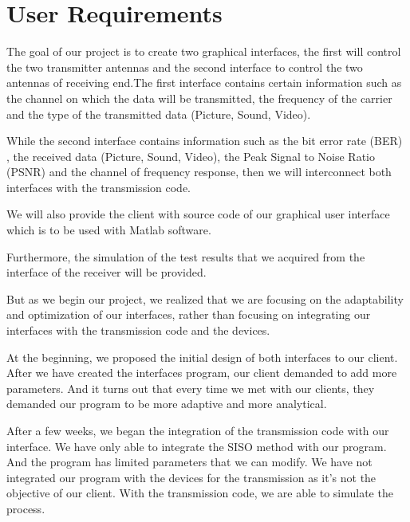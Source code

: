 \section{User Requirements}
\par The goal of our project is to create two graphical interfaces, the first will control the two transmitter antennas and the second interface to control the two antennas of receiving end.The first interface contains certain information such as the channel on which the data will be transmitted, the frequency of the carrier and the type of the transmitted data (Picture, Sound, Video).

\par \vspace{0.25cm}While the second interface contains information such as the bit error rate (BER) , the received data (Picture, Sound, Video), the Peak Signal to Noise Ratio (PSNR) and the channel of frequency response,
then we will interconnect both interfaces with the transmission code.

\par \vspace{0.25cm}We will also provide the client with source code of our graphical user interface which is to be used with Matlab software. 

\par \vspace{0.25cm}Furthermore, the simulation of the test results that we acquired from the interface of the receiver will be provided.

\par \vspace{0.25cm}But as we begin our project, we realized that we are focusing on the adaptability and optimization of our interfaces, rather than focusing on integrating our interfaces with the transmission code and the devices.

\par \vspace{0.25cm}At the beginning, we proposed the initial design of both interfaces to our client. After we have created the interfaces program, our client demanded to add more parameters. And it turns out that every time we met with our clients, they demanded our program to be more adaptive and more analytical.

\par \vspace{0.25cm}After a few weeks, we began the integration of the transmission code with our interface. We have only able to integrate the SISO method with our program. And the program has limited parameters that we can modify. We have not integrated our program with the devices for the transmission as it's not the objective of our client. With the transmission code, we are able to simulate the process. 

